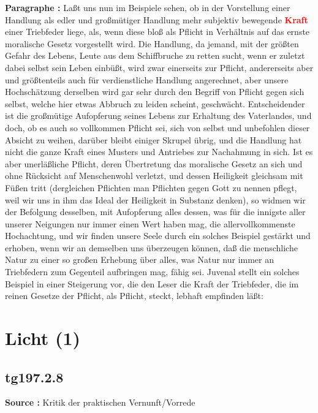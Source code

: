 \documentclass[a4paper,12pt,twoside]{book}
\newcommand{\match}[1]{\textcolor{red}{\textbf{#1}}}
\newcommand{\unnumberedsection}[1]{
	\section*{#1}
	\addcontentsline{toc}{section}{#1}
	\markright{#1}
}
\begin{document}
	\noindent\textbf{Paragraphe : }Laßt uns nun im Beispiele sehen, ob in der Vorstellung einer Handlung als edler und großmütiger Handlung mehr subjektiv bewegende \match{Kraft} einer Triebfeder liege, als, wenn diese bloß als Pflicht in Verhältnis auf das ernste moralische Gesetz vorgestellt wird. Die Handlung, da jemand, mit der größten Gefahr des Lebens, Leute aus dem Schiffbruche zu retten sucht, wenn er zuletzt dabei selbst sein Leben einbüßt, wird zwar einerseits zur Pflicht, andererseits aber und größtenteils auch für verdienstliche Handlung angerechnet, aber unsere Hochschätzung derselben wird gar sehr durch den Begriff von Pflicht gegen sich selbst, welche hier etwas Abbruch zu leiden scheint, geschwächt. Entscheidender ist die großmütige Aufopferung seines Lebens zur Erhaltung des Vaterlandes, und doch, ob es auch so vollkommen Pflicht sei, sich von selbst und unbefohlen dieser Absicht zu weihen, darüber bleibt einiger Skrupel übrig, und die Handlung hat nicht die ganze Kraft eines Musters und Antriebes zur Nachahmung in sich. Ist es aber unerläßliche Pflicht, deren Übertretung das moralische Gesetz an sich und ohne Rücksicht auf Menschenwohl verletzt, und dessen Heiligkeit gleichsam mit Füßen tritt (dergleichen Pflichten man Pflichten gegen Gott zu nennen pflegt, weil wir uns in ihm das Ideal der Heiligkeit in Substanz denken), so widmen  wir der Befolgung desselben, mit Aufopferung alles dessen, was für die innigste aller unserer Neigungen nur immer einen Wert haben mag, die allervollkommenste Hochachtung, und wir finden unsere Seele durch ein solches Beispiel gestärkt und erhoben, wenn wir an demselben uns überzeugen können, daß die menschliche Natur zu einer so großen Erhebung über alles, was Natur nur immer an Triebfedern zum Gegenteil aufbringen mag, fähig sei. Juvenal stellt ein solches Beispiel in einer Steigerung vor, die den Leser die Kraft der Triebfeder, die im reinen Gesetze der Pflicht, als Pflicht, steckt, lebhaft empfinden läßt: 
	
	\unnumberedsection{Licht (1)} 
	\subsection*{tg197.2.8} 
	\textbf{Source : }Kritik der praktischen Vernunft/Vorrede\\  
	
\end{document}
